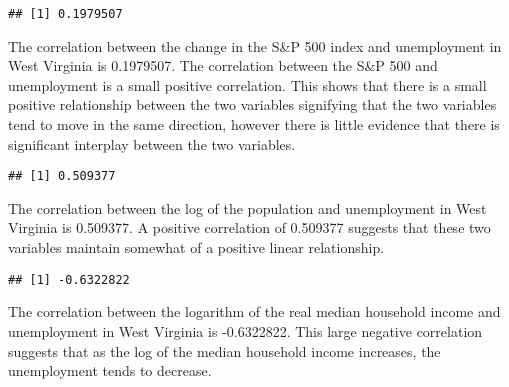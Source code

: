 \documentclass[
]{article}
\newenvironment{Shaded}{\begin{snugshade}}{\end{snugshade}}
\newcommand{\CharTok}[1]{\textcolor[rgb]{0.31,0.60,0.02}{#1}}
\newcommand{\DataTypeTok}[1]{\textcolor[rgb]{0.13,0.29,0.53}{#1}}
\newcommand{\DecValTok}[1]{\textcolor[rgb]{0.00,0.00,0.81}{#1}}
\newcommand{\KeywordTok}[1]{\textcolor[rgb]{0.13,0.29,0.53}{\textbf{#1}}}
\newcommand{\NormalTok}[1]{#1}
\newcommand{\OperatorTok}[1]{\textcolor[rgb]{0.81,0.36,0.00}{\textbf{#1}}}
\newcommand{\StringTok}[1]{\textcolor[rgb]{0.31,0.60,0.02}{#1}}
\begin{document}
\begin{verbatim}
## [1] 0.1979507
\end{verbatim}

The correlation between the change in the S\&P 500 index and
unemployment in West Virginia is 0.1979507. The correlation between the
S\&P 500 and unemployment is a small positive correlation. This shows
that there is a small positive relationship between the two variables
signifying that the two variables tend to move in the same direction,
however there is little evidence that there is significant interplay
between the two variables.

\begin{Shaded}
\end{Shaded}

\begin{verbatim}
## [1] 0.509377
\end{verbatim}

The correlation between the log of the population and unemployment in
West Virginia is 0.509377. A positive correlation of 0.509377 suggests
that these two variables maintain somewhat of a positive linear
relationship.

\begin{Shaded}
\end{Shaded}

\begin{verbatim}
## [1] -0.6322822
\end{verbatim}

The correlation between the logarithm of the real median household
income and unemployment in West Virginia is -0.6322822. This large
negative correlation suggests that as the log of the median household
income increases, the unemployment tends to decrease.

\begin{Shaded}
\end{Shaded}
\end{document}
